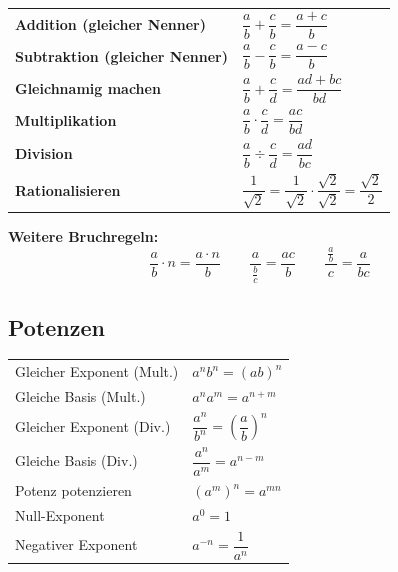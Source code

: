 \documentclass[../zusammenfassung_AN.tex]{subfiles}
\begin{document}
	\begin{tcolorbox}[dglbox, title={Bruchrechnung}]
		\renewcommand{\arraystretch}{1.8}
		\begin{tabular}{ll}
			\textbf{Addition (gleicher Nenner)}   & $\dfrac{a}{b}+\dfrac{c}{b} = \dfrac{a+c}{b}$ \\
			\textbf{Subtraktion (gleicher Nenner)}& $\dfrac{a}{b}-\dfrac{c}{b} = \dfrac{a-c}{b}$ \\
			\textbf{Gleichnamig machen}           & $\dfrac{a}{b}+\dfrac{c}{d} = \dfrac{ad+bc}{bd}$ \\[4pt]
			\textbf{Multiplikation}               & $\dfrac{a}{b}\cdot\dfrac{c}{d} = \dfrac{ac}{bd}$ \\
			\textbf{Division}                     & $\dfrac{a}{b}\div\dfrac{c}{d} = \dfrac{ad}{bc}$ \\[4pt]
			\textbf{Rationalisieren}              & $\dfrac{1}{\sqrt{2}} = \dfrac{1}{\sqrt{2}}\cdot\dfrac{\sqrt{2}}{\sqrt{2}} = \dfrac{\sqrt{2}}{2}$ \\
		\end{tabular}
		
		\medskip
		\textbf{Weitere Bruchregeln:}
		\[
		\frac{a}{b}\cdot n = \frac{a\cdot n}{b} \qquad
		\frac{a}{\,\frac{b}{c}\,} = \frac{ac}{b} \qquad
		\frac{\,\frac{a}{b}\,}{c} = \frac{a}{bc}
		\]
	\end{tcolorbox}
	
	\subsection{Potenzen}
	
	\begin{tcolorbox}[formelbox]
		\renewcommand{\arraystretch}{1.5}
		\begin{tabular}{ll}
			Gleicher Exponent (Mult.)  & $a^n b^n = (ab)^n$ \\
			Gleiche Basis (Mult.)      & $a^n a^m = a^{n+m}$ \\
			Gleicher Exponent (Div.)   & $\dfrac{a^n}{b^n} = \left(\dfrac{a}{b}\right)^n$ \\[6pt]
			Gleiche Basis (Div.)       & $\dfrac{a^n}{a^m} = a^{n-m}$ \\[6pt]
			Potenz potenzieren         & $(a^m)^n = a^{mn}$ \\
			Null-Exponent              & $a^0 = 1$ \\
			Negativer Exponent         & $a^{-n} = \dfrac{1}{a^n}$ \\
		\end{tabular}
	\end{tcolorbox}
	
\end{document}
